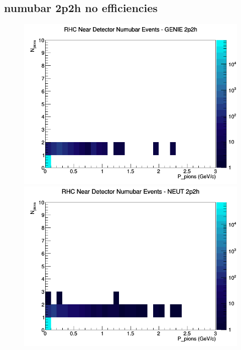 \documentclass[12pt]{article}
\begin{document}
\subsection{numubar 2p2h no efficiencies}
\begin{figure}[h]
\includegraphics[width=\linewidth]{N_P/nominal/pions/2p2h_RHC_ND_numubar_N_P_GENIE.png}
\endminipage
{}
\includegraphics[width=\linewidth]{N_P/nominal/pions/2p2h_RHC_ND_numubar_N_P_NEUT.png}
\endminipage
{}

\end{figure}
\end{document}
